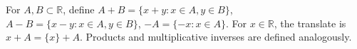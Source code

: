 For $A, B \subset \mathbb{R}$, define $A + B = \{x + y : x \in A, y \in B\}$, $A - B = \{x - y : x \in A, y \in B\}$, $-A = \{-x : x \in A\}$. For $x \in \mathbb{R}$, the translate is $x + A = \{x\} + A$. Products and multiplicative inverses are defined analogously.